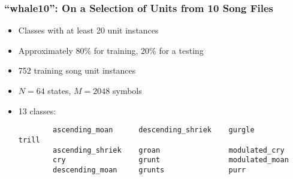 \documentclass{beamer}
\begin{document}
\begin{frame}[fragile]
\frametitle{``whale10'': On a Selection of Units from 10 Song Files}

\begin{itemize}
    \setlength\itemsep{1em}

    \item Classes with at least 20 unit instances
    \item Approximately 80\% for training, 20\% for a testing
    \item 752 training song unit instances
    \item $N = 64$ states, $M = 2048$ symbols
    \item 13 classes:
        \tiny{
        \begin{verbatim}
        ascending_moan      descending_shriek    gurgle            trill
        ascending_shriek    groan                modulated_cry
        cry                 grunt                modulated_moan
        descending_moan     grunts               purr
        \end{verbatim}
        }
\end{itemize}

\end{frame}
\end{document}

